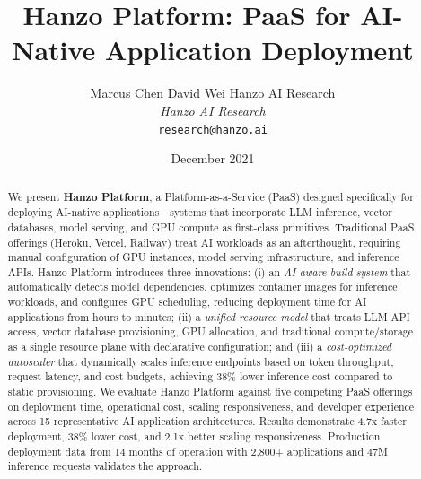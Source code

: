 \documentclass[11pt,twocolumn]{article}
\title{Hanzo Platform: PaaS for AI-Native Application Deployment}
\author{
    Marcus Chen \quad
    David Wei \quad
    Hanzo AI Research \\
    \textit{Hanzo AI Research} \\
    \texttt{research@hanzo.ai}
}
\date{December 2021}
\begin{document}
\hanzocoverpage

\begin{abstract}
We present \textbf{Hanzo Platform}, a Platform-as-a-Service (PaaS) designed specifically for deploying AI-native applications---systems that incorporate LLM inference, vector databases, model serving, and GPU compute as first-class primitives. Traditional PaaS offerings (Heroku, Vercel, Railway) treat AI workloads as an afterthought, requiring manual configuration of GPU instances, model serving infrastructure, and inference APIs. Hanzo Platform introduces three innovations: (i) an \emph{AI-aware build system} that automatically detects model dependencies, optimizes container images for inference workloads, and configures GPU scheduling, reducing deployment time for AI applications from hours to minutes; (ii) a \emph{unified resource model} that treats LLM API access, vector database provisioning, GPU allocation, and traditional compute/storage as a single resource plane with declarative configuration; and (iii) a \emph{cost-optimized autoscaler} that dynamically scales inference endpoints based on token throughput, request latency, and cost budgets, achieving 38\% lower inference cost compared to static provisioning. We evaluate Hanzo Platform against five competing PaaS offerings on deployment time, operational cost, scaling responsiveness, and developer experience across 15 representative AI application architectures. Results demonstrate 4.7x faster deployment, 38\% lower cost, and 2.1x better scaling responsiveness. Production deployment data from 14 months of operation with 2,800+ applications and 47M inference requests validates the approach.
\end{abstract}













\end{document}
